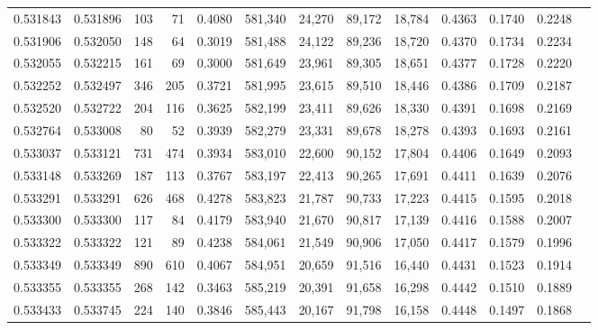\begin{tabular}{rrrrrrrrrrrrr}
0.531843 & 0.531896 &   103 &    71 &                                     0.4080 & 581,340 &  24,270 &  89,172 &  18,784 & 0.4363 & 0.1740 & 0.2248 \\
0.531906 & 0.532050 &   148 &    64 &                                     0.3019 & 581,488 &  24,122 &  89,236 &  18,720 & 0.4370 & 0.1734 & 0.2234 \\
0.532055 & 0.532215 &   161 &    69 &                                     0.3000 & 581,649 &  23,961 &  89,305 &  18,651 & 0.4377 & 0.1728 & 0.2220 \\
0.532252 & 0.532497 &   346 &   205 &                                     0.3721 & 581,995 &  23,615 &  89,510 &  18,446 & 0.4386 & 0.1709 & 0.2187 \\
0.532520 & 0.532722 &   204 &   116 &                                     0.3625 & 582,199 &  23,411 &  89,626 &  18,330 & 0.4391 & 0.1698 & 0.2169 \\
0.532764 & 0.533008 &    80 &    52 &                                     0.3939 & 582,279 &  23,331 &  89,678 &  18,278 & 0.4393 & 0.1693 & 0.2161 \\
0.533037 & 0.533121 &   731 &   474 &                                     0.3934 & 583,010 &  22,600 &  90,152 &  17,804 & 0.4406 & 0.1649 & 0.2093 \\
0.533148 & 0.533269 &   187 &   113 &                                     0.3767 & 583,197 &  22,413 &  90,265 &  17,691 & 0.4411 & 0.1639 & 0.2076 \\
0.533291 & 0.533291 &   626 &   468 &                                     0.4278 & 583,823 &  21,787 &  90,733 &  17,223 & 0.4415 & 0.1595 & 0.2018 \\
0.533300 & 0.533300 &   117 &    84 &                                     0.4179 & 583,940 &  21,670 &  90,817 &  17,139 & 0.4416 & 0.1588 & 0.2007 \\
0.533322 & 0.533322 &   121 &    89 &                                     0.4238 & 584,061 &  21,549 &  90,906 &  17,050 & 0.4417 & 0.1579 & 0.1996 \\
0.533349 & 0.533349 &   890 &   610 &                                     0.4067 & 584,951 &  20,659 &  91,516 &  16,440 & 0.4431 & 0.1523 & 0.1914 \\
0.533355 & 0.533355 &   268 &   142 &                                     0.3463 & 585,219 &  20,391 &  91,658 &  16,298 & 0.4442 & 0.1510 & 0.1889 \\
0.533433 & 0.533745 &   224 &   140 &                                     0.3846 & 585,443 &  20,167 &  91,798 &  16,158 & 0.4448 & 0.1497 & 0.1868 \\

\end{tabular}
